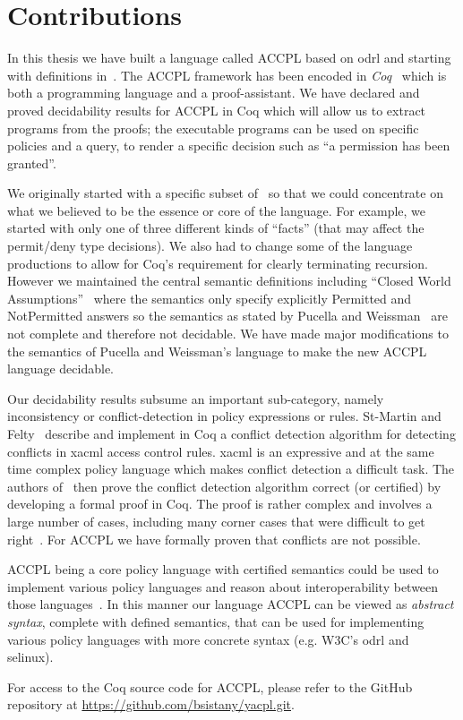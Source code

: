 \section{Contributions}

In this thesis we have built a language called \ac{ACCPL} based on \ac{odrl} and starting with definitions in~\cite{pucella2006}. The \ac{ACCPL} framework has been encoded in \emph{Coq}~\cite{BC04} which is both a programming language and a proof-assistant. We have declared and proved decidability results for \ac{ACCPL} in Coq which will allow us to extract programs from the proofs; the executable programs can be used on specific policies and a query, to render a specific decision such as ``a permission has been granted''. 

We originally started with a specific subset of~\cite{pucella2006} so that we could concentrate on what we believed to be the essence or core of the language. For example, we started with only one of three different kinds of ``facts'' (that may affect the permit/deny type decisions). We also had to change some of the language productions to allow for Coq's requirement for clearly terminating recursion. However we maintained the central semantic definitions including ``Closed World Assumptions''~\cite{pucella2006} where the semantics only specify explicitly Permitted and NotPermitted answers so the semantics as stated by Pucella and Weissman~\cite{pucella2006} are not complete and therefore not decidable. We have made major modifications to the semantics of Pucella and Weissman's language to make the new \ac{ACCPL} language decidable.
    
Our decidability results subsume an important sub-category, namely inconsistency or conflict-detection in policy expressions or rules. St-Martin and Felty~\cite{Stmartin} describe and implement in Coq a conflict detection algorithm for detecting conflicts in \ac{xacml} access control rules. \ac{xacml} is an expressive and at the same time complex policy language which makes conflict detection a difficult task. The authors of~\cite{Stmartin} then prove the conflict detection algorithm correct (or certified) by developing a formal proof in Coq. The proof is rather complex and involves a large number of cases, including many corner cases that were difficult to get right~\cite{Stmartin}. For \ac{ACCPL} we have formally proven that conflicts are not possible. 

\ac{ACCPL} being a core policy language with certified semantics could be used to implement various policy languages and reason about interoperability between those languages~\cite{prados2005interoperability, maronas2009architecture}. In this manner our language \ac{ACCPL} can be viewed as \emph{abstract syntax}, complete with defined semantics, that can be used for implementing various policy languages with more concrete syntax (e.g. W3C's \ac{odrl} and \ac{selinux}). 

For access to the Coq source code for \ac{ACCPL}, please refer to the GitHub repository at \url{https://github.com/bsistany/yacpl.git}.













